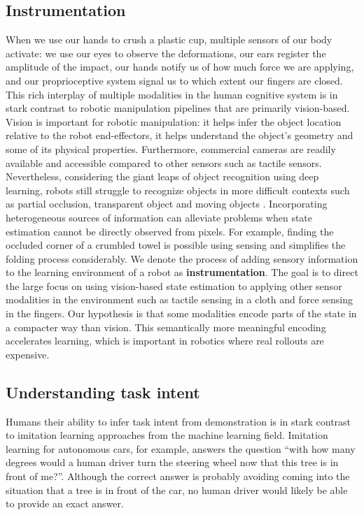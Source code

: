 \documentclass[\home/main.tex]{subfiles}
\begin{document}
\subsection{Instrumentation}
When we use our hands to crush a plastic cup, multiple sensors of our body activate: we use our eyes to observe the deformations, our ears register the amplitude of the impact, our hands notify us of how much force we are applying, and our proprioceptive system signal us to which extent our fingers are closed. This rich interplay of multiple modalities in the human cognitive system is in stark contrast to robotic manipulation pipelines that are primarily vision-based. Vision is important for robotic manipulation: it helps infer the object location relative to the robot end-effectors, it helps understand the object's geometry and some of its physical properties. Furthermore, commercial cameras are readily available and accessible compared to other sensors such as tactile sensors. Nevertheless, considering the giant leaps of object recognition using deep learning, robots still struggle to recognize objects in more difficult contexts such as partial occlusion, transparent object and moving objects \autocite{Guo2014,sajjan2019cleargrasp,Ojha2015}.
Incorporating heterogeneous sources of information can alleviate problems when state estimation cannot be directly observed from pixels. For example, finding the occluded corner of a crumbled towel is possible using sensing and simplifies the folding process considerably.
We denote the process of adding sensory information to the learning environment of a robot as \textbf{instrumentation}. The goal is to direct the large focus on using vision-based state estimation to applying other sensor modalities in the environment such as tactile sensing in a cloth and force sensing in the fingers. Our hypothesis is that some modalities encode parts of the state in a compacter way than vision. This semantically more meaningful encoding accelerates learning, which is important in robotics where real rollouts are expensive.

\subsection{Understanding task intent}
Humans their ability to infer task intent from demonstration is in stark contrast to imitation learning approaches from the machine learning field. Imitation learning for autonomous cars, for example, answers the question \enquote{with how many degrees would a human driver turn the steering wheel now that this tree is in front of me?}. 
Although the correct answer is probably avoiding coming into the situation that a tree is in front of the car, no human driver would likely be able to provide an exact answer.
\end{document}
